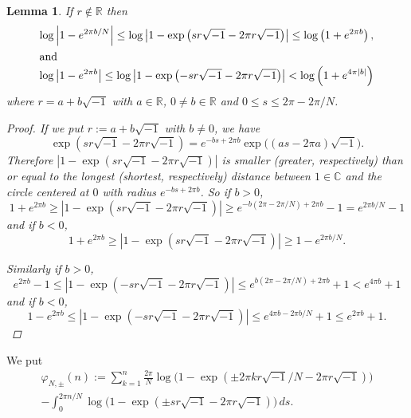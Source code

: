 \documentclass[a4paper]{amsart}
\theoremstyle{plain}
\newtheorem{lem}[thm]{Lemma}
\theoremstyle{definition}
\theoremstyle{remark}
\newcommand{\C}{\mathbb{C}}
\newcommand{\R}{\mathbb{R}}
\numberwithin{equation}{section}
\begin{document}
\begin{lem}\label{lem:max_min}
If $r\not\in\R$ then
\begin{gather*}
  \log\left|1-e^{2\pi{b}/N}\right|
  \le
  \log\left|1-\exp\left(sr\sqrt{-1}-2\pi{r}\sqrt{-1}\right)\right|
  \le
  \log\left(1+e^{2\pi{b}}\right),
  \\
  \intertext{and}
  \log\left|1-e^{2\pi{b}}\right|
  \le
  \log\left|1-\exp\left(-sr\sqrt{-1}-2\pi{r}\sqrt{-1}\right)\right|
  <
  \log\left(1+e^{4\pi|b|}\right)
\end{gather*}
where $r=a+b\sqrt{-1}$ with $a\in\R$, $0\ne{b}\in\R$ and
$0\le{s}\le2\pi-2\pi/N$.
\begin{proof}
If we put $r:=a+b\sqrt{-1}$ with $b\ne0$, we have
\begin{equation*}
  \exp\left(sr\sqrt{-1}-2\pi{r}\sqrt{-1}\right)
  =
  e^{-bs+2\pi{b}}\exp\bigl((as-2\pi{a})\sqrt{-1}\bigr).
\end{equation*}
Therefore
$\left|1-\exp\left(sr\sqrt{-1}-2\pi{r}\sqrt{-1}\right)\right|$
is smaller (greater, respectively) than or equal to the longest
(shortest, respectively) distance between $1\in\C$
and the circle centered at $0$ with radius $e^{-bs+2\pi{b}}$.
So if $b>0$,
\begin{equation*}
  1+e^{2\pi{b}}
  \ge
  \left|1-\exp\left(sr\sqrt{-1}-2\pi{r}\sqrt{-1}\right)\right|
  \ge
  e^{-b(2\pi-2\pi/N)+2\pi{b}}-1
  =
  e^{2\pi{b}/N}-1
\end{equation*}
and if $b<0$,
\begin{equation*}
  1+e^{2\pi{b}}
  \ge
  \left|1-\exp\left(sr\sqrt{-1}-2\pi{r}\sqrt{-1}\right)\right|
  \ge
  1-e^{2\pi{b}/N}.
\end{equation*}
\par
Similarly if $b>0$,
\begin{equation*}
  e^{2\pi{b}}-1
  \le
  \left|1-\exp\left(-sr\sqrt{-1}-2\pi{r}\sqrt{-1}\right)\right|
  \le
  e^{b(2\pi-2\pi/N)+2\pi{b}}+1
  <
  e^{4\pi{b}}+1
\end{equation*}
and if $b<0$,
\begin{equation*}
  1-e^{2\pi{b}}
  \le
  \left|1-\exp\left(-sr\sqrt{-1}-2\pi{r}\sqrt{-1}\right)\right|
  \le
  e^{4\pi{b}-2\pi{b}/N}+1
  \le
  e^{2\pi{b}}+1.
\end{equation*}
\end{proof}
\end{lem}
We put
\begin{multline*}
  \varphi_{N,\pm}(n)
  :=
  \sum_{k=1}^{n}
  \frac{2\pi}{N}
  \log
  \bigl(
    1-\exp(\pm2\pi{k}r\sqrt{-1}/N-2\pi{r}\sqrt{-1})
  \bigr)
  \\
  -
  \int_{0}^{2{\pi}n/N}
  \log
  \bigl(
    1-\exp({\pm}sr\sqrt{-1}-2{\pi}r\sqrt{-1})
  \bigr)\,ds.
\end{multline*}
\end{document}
